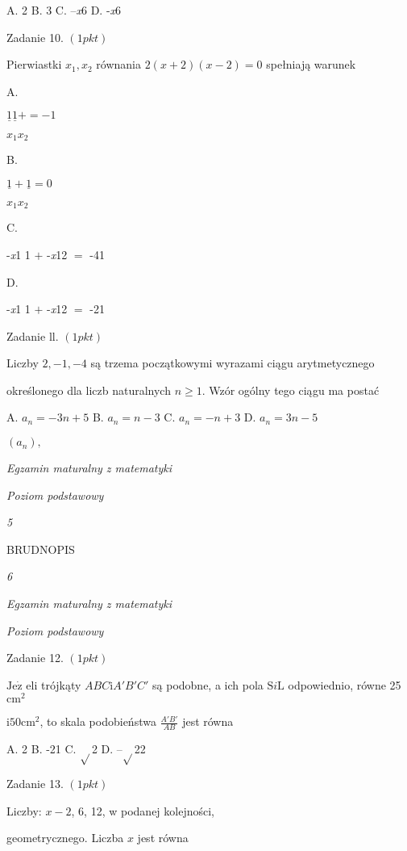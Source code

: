 \documentclass[a4paper,12pt]{article}
\begin{document}
A. 2 B. 3 C. --{\it x}6 D. -{\it x}6

Zadanie 10. $(1pkt)$

Pierwiastki $x_{1}, x_{2}$ równania $2(x+2)(x-2)=0$ spełniają warunek

A.

$\underline{1}\underline{1}+=-1$

$x_{1} x_{2}$

B.

$\underline{1}+\underline{1}=0$

$x_{1} x_{2}$

C.

-{\it x}1  1 $+$ -{\it x}12 $=$ -41

D.

-{\it x}1  1 $+$ -{\it x}12 $=$ -21

Zadanie ll. $(1pkt)$

Liczby $2, -1, -4$ są trzema początkowymi wyrazami ciągu arytmetycznego

określonego dla liczb naturalnych $n\geq 1$. Wzór ogólny tego ciągu ma postać

A. $a_{n}=-3n+5$ B. $a_{n}=n-3$ C. $a_{n}=-n+3$ D. $a_{n}=3n-5$

$(a_{n}),$





{\it Egzamin maturalny z matematyki}

{\it Poziom podstawowy}

{\it 5}

BRUDNOPIS





{\it 6}

{\it Egzamin maturalny z matematyki}

{\it Poziom podstawowy}

Zadanie 12. $(1pkt)$

$\mathrm{J}\mathrm{e}\dot{\mathrm{z}}$ eli trójkąty $ABC \mathrm{i} A'B'C'$ są podobne, a ich pola $\mathrm{S}i\mathrm{L}$ odpowiednio, równe 25 $\mathrm{c}\mathrm{m}^{2}$

$\mathrm{i}50\mathrm{c}\mathrm{m}^{2}$, to skala podobieństwa $\displaystyle \frac{A'B'}{AB}$ jest równa

A. 2 B. -21 C. $\sqrt{}$2 D. --$\sqrt{}$22

Zadanie 13. $(1pkt)$

Liczby: $x-2$, 6, 12, w podanej kolejności,

geometrycznego. Liczba $x$ jest równa
\end{document}
